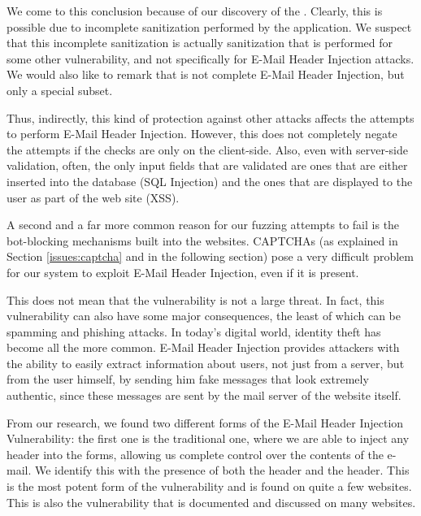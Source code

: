 	We come to this conclusion because of our discovery of the . Clearly, this is possible due to incomplete sanitization performed by the application. We suspect that this incomplete sanitization is actually sanitization that is performed for some other vulnerability, and not specifically for E-Mail Header Injection attacks. We would also like to remark that  is not complete E-Mail Header Injection, but only a special subset.
	
    Thus, indirectly, this kind of protection against other attacks affects the attempts to perform E-Mail Header Injection. However, this does not completely negate the attempts if the checks are only on the client-side. Also, even with server-side validation, often, the only input fields that are validated are ones that are either inserted into the database (SQL Injection) and the ones that are displayed to the user as part of the web site (XSS).

	A second and a far more common reason for our fuzzing attempts to fail is the bot-blocking mechanisms built into the websites. CAPTCHAs (as explained in Section \ref{issues:captcha} and in the following section) pose a very difficult problem for our system to exploit E-Mail Header Injection, even if it is present.

	This does not mean that the vulnerability is not a large threat. In fact, this vulnerability can also have some major consequences, the least of which can be spamming and phishing attacks.
	In today's digital world, identity theft has become all the more common. E-Mail Header Injection provides attackers with the ability to easily extract information about users, not just from a server, but from the user himself, by sending him fake messages that look extremely authentic, since these messages are sent by the mail server of the website itself.
    
    From our research, we found two different forms of the E-Mail Header Injection Vulnerability: the first one is the traditional one, where we are able to inject any header into the forms, allowing us complete control over the contents of the e-mail. We identify this with the presence of both the  header and the  header. This is the most potent form of the vulnerability and is found on quite a few websites. This is also the vulnerability that is documented and discussed on many websites.
    
